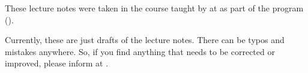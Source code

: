 \begin{myminipage} 
     These lecture notes were taken in the course \textit{\courseloc} taught by \profloc{} at \instituteloc{} as part of the \classloc{} program (\sessionloc). \bigskip
     
     Currently, these are just drafts of the lecture notes. There can be typos and mistakes anywhere. So, if you find anything that needs to be corrected or improved, please inform at \myemailloc. \bigskip

\end{myminipage}
